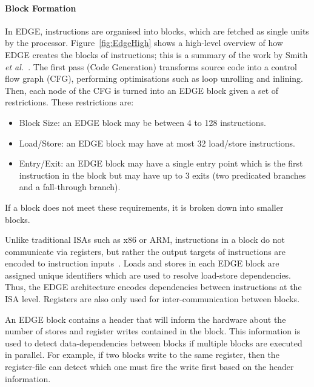 \paragraph*{Block Formation}
In EDGE, instructions are organised into blocks, which are fetched as single units by the processor.
Figure~\ref{fig:EdgeHigh} shows a high-level overview of how EDGE creates the blocks of instructions; this is a summary of the work by Smith {\it et al.~}\cite{smith2006edge}. 
The first pass (Code Generation) transforms source code into a control flow graph (CFG), performing optimisations such as loop unrolling and inlining.
Then, each node of the CFG is turned into an EDGE block given a set of restrictions.
These restrictions are:
\begin{itemize}
\item Block Size: an EDGE block may be between 4 to 128 instructions.
\vspace{-1em}
\item Load/Store: an EDGE block may have at most 32 load/store instructions.
\vspace{-1em}
\item Entry/Exit: an EDGE block may have a single entry point which is the first instruction in the block but may have up to 3 exits (two predicated branches and a fall-through branch).
\end{itemize}
If a block does not meet these requirements, it is broken down into smaller blocks.

Unlike traditional ISAs such as x86 or ARM, instructions in a block do not communicate via registers, but rather the output targets of instructions are encoded to instruction inputs~\cite{smith2006edge}.
Loads and stores in each EDGE block are assigned unique identifiers which are used to resolve load-store dependencies.
Thus, the EDGE architecture encodes dependencies between instructions at the ISA level.
Registers are also only used for inter-communication between blocks.

An EDGE block contains a header that will inform the hardware about the number of stores and register writes contained in the block.
This information is used to detect data-dependencies between blocks if multiple blocks are executed in parallel.
For example, if two blocks write to the same register, then the register-file can detect which one must fire the write first based on the header information. 

